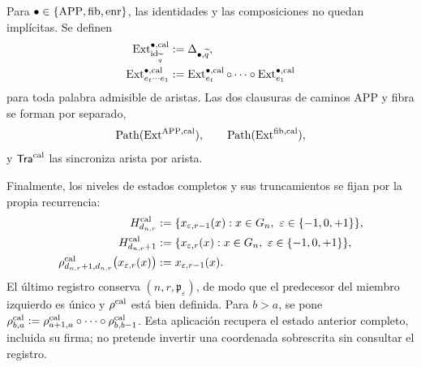 Para \(\bullet\in\{\mathrm{APP},{\rm fib},{\rm enr}\}\), las identidades y las
composiciones no quedan implícitas. Se definen
\begin{align}
 \operatorname{Ext}^{\bullet,\rm cal}_{\operatorname{id}_{\widetilde q}}
   &:=\Delta_{\bullet,\widetilde q},\\
 \operatorname{Ext}^{\bullet,\rm cal}_{e_t\cdots e_1}
   &:=\operatorname{Ext}^{\bullet,\rm cal}_{e_t}\circ\cdots\circ
      \operatorname{Ext}^{\bullet,\rm cal}_{e_1}
 \label{hmtfg:eq:ext-palabra-calibrada-ch}
\end{align}
para toda palabra admisible de aristas. Las dos clausuras de caminos APP y
fibra se forman por separado,
\begin{equation}
 \operatorname{Path}(\operatorname{Ext}^{\mathrm{APP},\rm cal}),\qquad
 \operatorname{Path}(\operatorname{Ext}^{\rm fib,cal}),
 \label{hmtfg:eq:dos-clausuras-ext-ch}
\end{equation}
y \(\mathsf{Tra}^{\rm cal}\) las sincroniza arista por arista.

Finalmente, los niveles de estados completos y sus truncamientos se fijan
por la propia recurrencia:
\begin{align}
 H^{\rm cal}_{d_{n,r}}
   &:=\{x_{\varepsilon,r-1}(x):
          x\in G_n,\ \varepsilon\in\{-1,0,+1\}\},\\
 H^{\rm cal}_{d_{n,r}+1}
   &:=\{x_{\varepsilon,r}(x):
          x\in G_n,\ \varepsilon\in\{-1,0,+1\}\},\\
 \rho^{\rm cal}_{d_{n,r}+1,d_{n,r}}
   \bigl(x_{\varepsilon,r}(x)\bigr)
   &:=x_{\varepsilon,r-1}(x).
 \label{hmtfg:eq:truncamiento-calibrado-definido-ch}
\end{align}
El último registro conserva \((n,r,\mathfrak p_\varepsilon)\), de modo que
el predecesor del miembro izquierdo es único y \(\rho^{\rm cal}\) está bien
definida. Para \(b>a\), se pone
\(\rho^{\rm cal}_{b,a}:=\rho^{\rm cal}_{a+1,a}\circ\cdots\circ
\rho^{\rm cal}_{b,b-1}\). Esta aplicación recupera el estado anterior
completo, incluida su firma; no pretende invertir una coordenada sobrescrita
sin consultar el registro.

